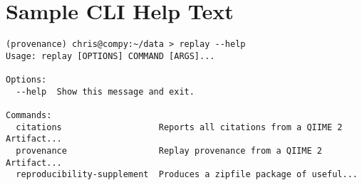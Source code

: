 \chapter{Sample CLI Help Text}
\label{app:cliHelp}

\begin{footnotesize}
\begin{verbatim}
(provenance) chris@compy:~/data > replay --help
Usage: replay [OPTIONS] COMMAND [ARGS]...

Options:
  --help  Show this message and exit.

Commands:
  citations                   Reports all citations from a QIIME 2 Artifact...
  provenance                  Replay provenance from a QIIME 2 Artifact...
  reproducibility-supplement  Produces a zipfile package of useful...
\end{verbatim}
\end{footnotesize}

\clearpage

